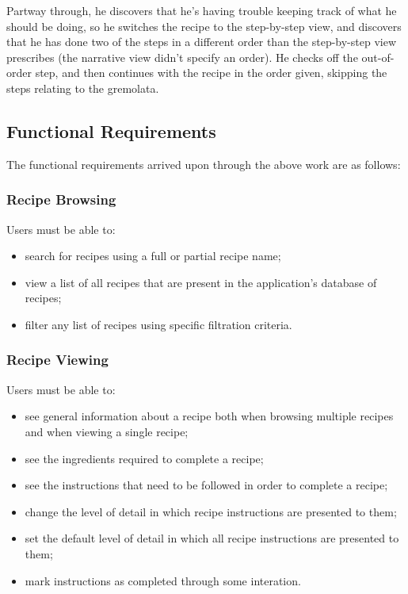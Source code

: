 Partway through, he discovers that he's having trouble keeping track of what he
should be doing, so he switches the recipe to the step-by-step view, and
discovers that he has done two of the steps in a different order than the 
step-by-step view prescribes (the narrative view didn't specify an order). He
checks off the out-of-order step, and then continues with the recipe in the
order given, skipping the steps relating to the gremolata.

\subsection{Functional Requirements}
The functional requirements arrived upon through the above work are as follows:

\subsubsection{Recipe Browsing}
Users must be able to:
\begin{itemize}
\item search for recipes using a full or partial recipe name;
\item view a list of all recipes that are present in the application's database of recipes;
\item filter any list of recipes using specific filtration criteria.
\end{itemize}

\subsubsection{Recipe Viewing}
Users must be able to:
\begin{itemize}
\item see general information about a recipe both when browsing multiple recipes and when viewing a single recipe;
\item see the ingredients required to complete a recipe;
\item see the instructions that need to be followed in order to complete a recipe;
\item change the level of detail in which recipe instructions are presented to them;
\item set the default level of detail in which all recipe instructions are presented to them;
\item mark instructions as completed through some interation.
\end{itemize}

